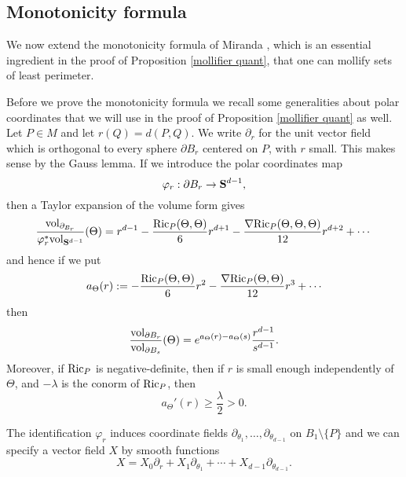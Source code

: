 
\subsection{Monotonicity formula}\label{inequalities}
We now extend the monotonicity formula of Miranda \cite[Teorema 3.3]{Miranda66}, which is an essential ingredient in the proof of Proposition \ref{mollifier quant}, that one can mollify sets of least perimeter.

Before we prove the monotonicity formula we recall some generalities about polar coordinates that we will use in the proof of Proposition \ref{mollifier quant} as well.
Let $P \in M$ and let $r(Q) = d(P, Q)$.
We write $\partial_r$ for the unit vector field which is orthogonal to every sphere $\partial B_r$ centered on $P$, with $r$ small.
This makes sense by the Gauss lemma.
If we introduce the polar coordinates map
$$\varphi_r: \partial B_r \to \mathbf S^{d - 1},$$
then a Taylor expansion of the volume form \cite[Lemma 3.4]{schoen1994lectures} gives
\begin{equation}\label{spheres in polar coordinates}
\frac{\mathrm{vol}_{\partial_{B_r}}}{\varphi_r^* \mathrm{vol}_{\mathbf S^{d - 1}}}(\Theta) = r^{d - 1} - \frac{\mathrm{Ric}_P(\Theta, \Theta)}{6}r^{d + 1} - \frac{\nabla \mathrm{Ric}_P(\Theta, \Theta, \Theta)}{12}r^{d + 2} + \cdots
\end{equation}
and hence if we put 
\begin{align*}
a_\Theta(r) := -\frac{\mathrm{Ric}_P(\Theta, \Theta)}{6}r^2 - \frac{\nabla \mathrm{Ric}_P(\Theta, \Theta)}{12}r^3 + \cdots
\end{align*}
then
\begin{equation}\label{rescale the sphere form}
\frac{\mathrm{vol}_{\partial B_r}}{\mathrm{vol}_{\partial B_s}}(\Theta) = e^{a_\Theta(r) - a_\Theta(s)} \frac{r^{d - 1}}{s^{d - 1}}.
\end{equation}
Moreover, if $\mathrm{Ric}_P$ is negative-definite, then if $r$ is small enough independently of $\Theta$, and $-\lambda$ is the conorm of $\mathrm{Ric}_P$, then 
\begin{equation}\label{a is nondecreasing}
a_\Theta'(r) \geq \frac{\lambda}{2} > 0.
\end{equation}

The identification $\varphi_r$ induces coordinate fields $\partial_{\theta_1}, \dots, \partial_{\theta_{d - 1}}$ on $B_1 \setminus \{P\}$ and we can specify a vector field $X$ by smooth functions 
$$X = X_0 \partial_r + X_1 \partial_{\theta_1} + \cdots + X_{d - 1} \partial_{\theta_{d - 1}}.$$

